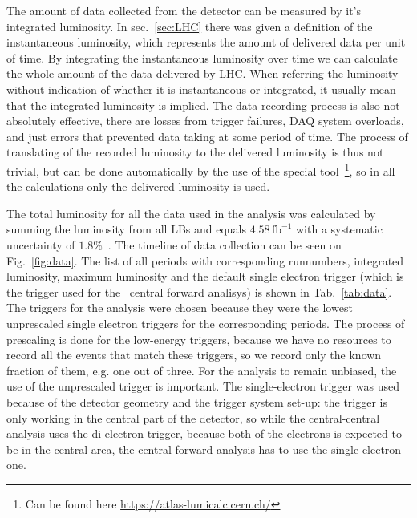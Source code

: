 The amount of data collected from the detector can be measured by it's integrated luminosity. In sec.~\ref{sec:LHC} there was given a definition of the instantaneous luminosity, which represents the amount of delivered data per unit of time. By integrating the instantaneous luminosity over time we can calculate the whole amount of the data delivered by LHC. When referring the luminosity without indication of whether it is instantaneous or integrated, it usually mean that the integrated luminosity is implied. The data recording process is also not absolutely effective, there are losses from trigger failures, DAQ system overloads, and just errors that prevented data taking at some period of time. The process of translating of the recorded luminosity to the delivered luminosity is thus not trivial, but can be done automatically by the use of the special tool~\footnote{Can be found here \url{https://atlas-lumicalc.cern.ch/}}, so in all the calculations only the delivered luminosity is used.

The total luminosity for all the data used in the analysis was calculated by summing the luminosity from all LBs and equals \ensuremath{4.58\,\mathrm{fb}^{-1}} with a systematic uncertainty of $1.8\%$~\cite{lib:lumi}. The timeline of data collection can be seen on Fig.~\ref{fig:data}. The list of all periods with corresponding runnumbers, integrated luminosity, maximum luminosity and the default single electron trigger (which is the trigger used for the \Zee\ central forward analisys) is shown in Tab.~\ref{tab:data}. The triggers for the analysis were chosen because they were the lowest unprescaled single electron triggers for the corresponding periods. The process of prescaling is done for the low-energy triggers, because we have no resources to record all the events that match these triggers, so we record only the known fraction of them, e.g. one out of three. For the analysis to remain unbiased, the use of the unprescaled trigger is important. The single-electron trigger was used because of the detector geometry and the trigger system set-up: the trigger is only working in the central part of the detector, so while the central-central analysis uses the di-electron trigger, because both of the electrons is expected to be in the central area, the central-forward analysis has to use the single-electron one.


